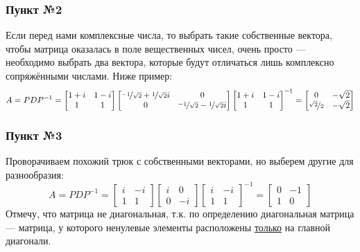 \documentclass[a3paper,14pt]{extarticle}
\begin{document}
\subsubsection*{Пункт №2}
Если перед нами комплексные числа, то выбрать такие собственные вектора, чтобы матрица оказалась в поле вещественных чисел, очень просто --- необходимо выбрать два вектора, которые будут отличаться лишь комплексно сопряжёнными числами. Ниже пример:
$$A = PDP^{-1} = \begin{bmatrix}
    1+i & 1-i \\ 1 & 1
\end{bmatrix}\begin{bmatrix}
    \nicefrac{-1}{\sqrt{2}}+\nicefrac{1}{\sqrt{2}}i & 0 \\ 0 & \nicefrac{-1}{\sqrt{2}}-\nicefrac{1}{\sqrt{2}}i
\end{bmatrix}\begin{bmatrix}
    1+i & 1-i \\ 1 & 1
\end{bmatrix}^{-1} = \begin{bmatrix}
    0 & -\sqrt{2} \\ \nicefrac{\sqrt{2}}{2} & -\sqrt{2}
\end{bmatrix}$$
\subsubsection*{Пункт №3}
Проворачиваем похожий трюк с собственными векторами, но выберем другие для разнообразия:
$$A = PDP^{-1} = \begin{bmatrix}
    i & -i \\ 1 & 1
\end{bmatrix}\begin{bmatrix}
    i & 0 \\ 0 & -i
\end{bmatrix}\begin{bmatrix}
    i & -i \\ 1 & 1
\end{bmatrix}^{-1} = \begin{bmatrix}
    0 & -1 \\ 1 & 0
\end{bmatrix}$$
Отмечу, что матрица не диагональная, т.к. по определению диагональная матрица --- матрица, у которого ненулевые элементы расположены \underline{только} на главной диагонали.
\end{document}
